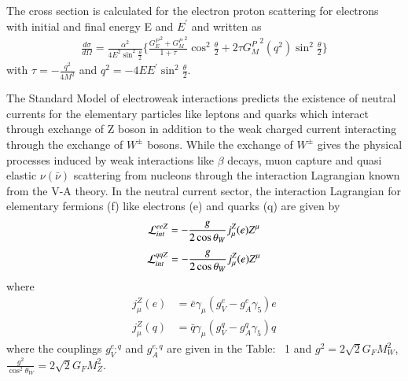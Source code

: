  The cross section is calculated for the electron proton scattering for electrons with initial and final energy E and $E^\prime$ and written as
  \begin{eqnarray}
  \frac{d\sigma}{d\Omega}= \frac{\alpha^2}{4E^2\sin^2\frac{\theta}{2}}\Big\lbrace\frac{{G_E^P}^{2}+{G_M^P}^{2}}{1+\tau} \cos^2\frac{\theta}{2}+2\tau {G_M^P}^{2}(q^2)\sin^2\frac{\theta}{2}\Big\rbrace \label{chap9-eq8}
  \end{eqnarray}
  with $\tau=-\frac{q^2}{4M^2}$ and $q^2=-4EE^\prime \sin^2\frac{\theta}{2}$. 
  
  \smallskip
  
The Standard Model of electroweak interactions predicts the existence of neutral currents  for the elementary particles like leptons and quarks which interact through exchange of Z  boson in addition to the weak charged current interacting through the exchange of $W^\pm$ bosons. While the exchange of $W^\pm$  gives the physical processes induced by weak interactions like $\beta$  decays, muon  capture and  quasi elastic $\nu(\bar{\nu})$  scattering from nucleons through the interaction Lagrangian known from the V-A theory.  In the neutral current sector,  the interaction Lagrangian for elementary fermions (f) like electrons (e) and quarks (q) are given by
\begin{equation}
{\cal L}_{int}^{eeZ}=-\frac{g}{2\cos\theta_W}j_\mu^Z(e)Z^\mu \label{chap9-eq9}
\end{equation}
\begin{equation}
{\cal L}_{int}^{qqZ}=-\frac{g}{2\cos\theta_W}j_\mu^Z(e)Z^\mu \label{chap9-eq10}
\end{equation}
where  
\begin{align}
    j_\mu^Z(e) & = \bar{e}\gamma_\mu(g_V^e-g_A^e\gamma_5)e  \label{chap9-eq11}\\ 
    j_\mu^Z(q) & = \bar{q}\gamma_\mu(g_V^q-g_A^q \gamma_5)q \label{chap9-eq12}
\end{align} 
where the couplings $g_V^{e,q}$ and $g_A^{e,q}$ are given in the Table:~ 1 and $g^2=2\sqrt{2}G_F M_W^2$, $\frac{g^2}{\cos^2\theta_W}=2\sqrt{2}G_F M^2_Z$.
